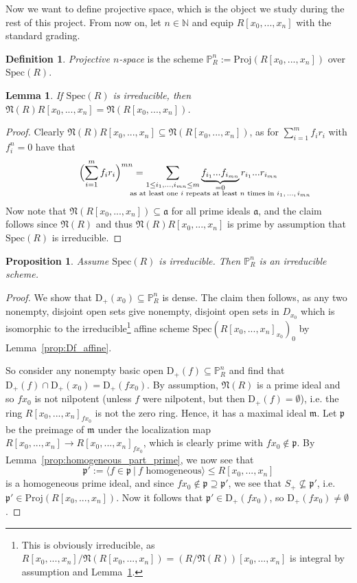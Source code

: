 \documentclass{scrartcl}
\newcommand{\N}{\mathbb{N}}
\newcommand{\D}[1]{\mathrm{D}_+(#1)}
\renewcommand{\P}{\mathbb{P}}
\newcommand{\p}{\mathfrak{p}}
\newcommand{\m}{\mathfrak{m}}
\renewcommand{\a}{\mathfrak{a}}
\renewcommand{\m}{\mathfrak{m}}
\newcommand{\Nil}{\mathfrak{N}}
\newcommand{\Spec}{\mathrm{Spec}}
\newcommand{\Proj}{\mathrm{Proj}}
\newtheorem{prop}[subsection]{Proposition}
\newtheorem{lemma}[subsection]{Lemma}
\theoremstyle{definition}
\newtheorem{definition}[subsection]{Definition}
\begin{document}
Now we want to define projective space, which is the object we study during the rest of this project.
From now on, let $n \in \N$ and equip $R[x_0, ..., x_n]$ with the standard grading.
\begin{definition}
    \emph{Projective $n$-space} is the scheme $\P_R^n := \Proj(R[x_0, ..., x_n])$ over $\Spec(R)$.
\end{definition}
\begin{lemma}
    \label{prop:nil_poly_ring}
    If $\Spec(R)$ is irreducible, then $\Nil(R)R[x_0, ..., x_n] = \Nil(R[x_0, ..., x_n])$.
\end{lemma}
\begin{proof}
    Clearly $\Nil(R)R[x_0, ..., x_n] \subseteq \Nil(R[x_0, ..., x_n])$, as for $\sum_{i = 1}^m f_i r_i$ with $f_i^n = 0$ have that
    \begin{equation*}
        \Bigl( \sum_{i = 1}^m f_i r_i \Bigr)^{m n} = \sum_{1 \leq i_1, ..., i_{mn} \leq m} \underbrace{f_{i_1} ... f_{i_{mn}}}_{\mathclap{\substack{= 0 \\ \text{as at least one $i$ repeats at least $n$ times in $i_1, ..., i_{mn}$}}}} r_{i_1} ... r_{i_{m n}}
    \end{equation*}
    Now note that $\Nil(R[x_0, ..., x_n]) \subseteq \a$ for all prime ideals $\a$, and the claim follows since $\Nil(R)$ and thus $\Nil(R)R[x_0, ..., x_n]$ is prime by assumption that $\Spec(R)$ is irreducible.
\end{proof}
\begin{prop}
    Assume $\Spec(R)$ is irreducible.
    Then $\P_R^n$ is an irreducible scheme.
\end{prop}
\begin{proof}
    We show that $\D{x_0} \subseteq \P_R^n$ is dense.
    The claim then follows, as any two nonempty, disjoint open sets give nonempty, disjoint open sets in $D_{x_0}$ which is isomorphic to the 
    irreducible\footnote{This is obviously irreducible, as $R[x_0, ..., x_n]/\Nil(R[x_0, ..., x_n]) = (R/\Nil(R))[x_0, ..., x_n]$ is integral by assumption and Lemma~\ref{prop:nil_poly_ring}.}
    affine scheme $\Spec(R[x_0, ..., x_n]_{x_0})_0$ by Lemma~\ref{prop:Df_affine}.

    So consider any nonempty basic open $\D{f} \subseteq \P_R^n$ and find that $\D{f} \cap \D{x_0} = \D{fx_0}$.
    By assumption, $\Nil(R)$ is a prime ideal and so $fx_0$ is not nilpotent (unless $f$ were nilpotent, but then $\D{f} = \emptyset$), i.e. the ring $R[x_0, ..., x_n]_{fx_0}$ is not the zero ring.
    Hence, it has a maximal ideal $\m$.
    Let $\p$ be the preimage of $\m$ under the localization map $R[x_0, ..., x_n] \to R[x_0, ..., x_n]_{fx_0}$, which is clearly prime with $fx_0 \notin \p$.
    By Lemma~\ref{prop:homogeneous_part_prime}, we now see that
    \begin{equation*}
        \p' := \langle f \in \p \ | \ \text{$f$ homogeneous} \rangle \leq R[x_0, ..., x_n]
    \end{equation*}
    is a homogeneous prime ideal, and since $fx_0 \notin \p \supseteq \p'$, we see that $S_+ \not\subseteq \p'$, i.e. $\p' \in \Proj(R[x_0, ..., x_n])$.
    Now it follows that $\p' \in \D{fx_0}$, so $\D{fx_0} \neq \emptyset$.
\end{proof}
\end{document}
